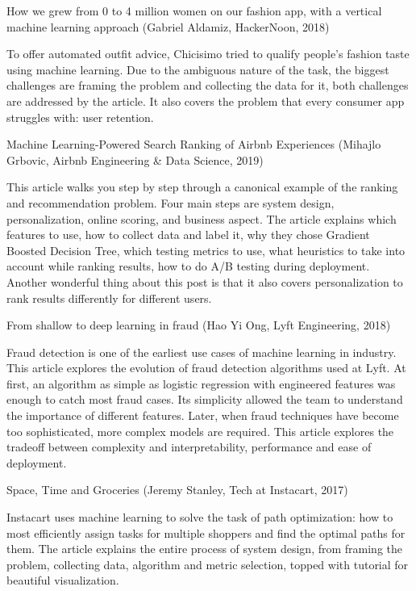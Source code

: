 \documentclass[openany]{book}
\begin{document}
    How we grew from 0 to 4 million women on our fashion app, with a vertical machine learning approach (Gabriel Aldamiz, HackerNoon, 2018)

    To offer automated outfit advice, Chicisimo tried to qualify people's fashion taste using machine learning. Due to the ambiguous nature of the task, the biggest challenges are framing the problem and collecting the data for it, both challenges are addressed by the article. It also covers the problem that every consumer app struggles with: user retention.

    Machine Learning-Powered Search Ranking of Airbnb Experiences (Mihajlo Grbovic, Airbnb Engineering & Data Science, 2019)

    This article walks you step by step through a canonical example of the ranking and recommendation problem. Four main steps are system design, personalization, online scoring, and business aspect. The article explains which features to use, how to collect data and label it, why they chose Gradient Boosted Decision Tree, which testing metrics to use, what heuristics to take into account while ranking results, how to do A/B testing during deployment. Another wonderful thing about this post is that it also covers personalization to rank results differently for different users.

    From shallow to deep learning in fraud (Hao Yi Ong, Lyft Engineering, 2018)

    Fraud detection is one of the earliest use cases of machine learning in industry. This article explores the evolution of fraud detection algorithms used at Lyft. At first, an algorithm as simple as logistic regression with engineered features was enough to catch most fraud cases. Its simplicity allowed the team to understand the importance of different features. Later, when fraud techniques have become too sophisticated, more complex models are required. This article explores the tradeoff between complexity and interpretability, performance and ease of deployment.

    Space, Time and Groceries (Jeremy Stanley, Tech at Instacart, 2017)

    Instacart uses machine learning to solve the task of path optimization: how to most efficiently assign tasks for multiple shoppers and find the optimal paths for them. The article explains the entire process of system design, from framing the problem, collecting data, algorithm and metric selection, topped with tutorial for beautiful visualization.
\end{document}
